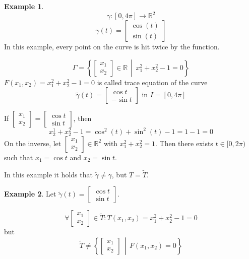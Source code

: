\documentclass[a4paper,landscape,twocolumn]{article}
\theoremstyle{definition}
\newtheorem{ex}{Example}
\newcommand\setdef[2]{\left\{#1\,\middle|\,#2\right\}}
\begin{document}
\begin{ex}
  \[ \gamma: [0, 4\pi] \to \mathbb R^2 \]
  \[ \gamma(t) = \begin{bmatrix} \cos(t) \\ \sin(t) \end{bmatrix} \]
  In this example, every point on the curve is hit twice by the function.

  \[ \Gamma = \setdef{\begin{bmatrix} x_1 \\ x_2 \end{bmatrix} \in \mathbb R}{x_1^2 + x_2^2 - 1 =0 } \]
  $F(x_1, x_2) = x_1^2 + x_2^2 - 1 = 0$ is called trace equation of the curve
  \[ \tilde{\gamma}(t) = \begin{bmatrix} \cos{t} \\ -\sin{t} \end{bmatrix} \text{ in } I = [0, 4\pi] \]

  If $\begin{bmatrix} x_1 \\ x_2 \end{bmatrix} = \begin{bmatrix} \cos{t} \\ \sin{t} \end{bmatrix}$, then
  \[ x_2^1 + x_2^2 - 1 = \cos^2(t) + \sin^2(t) - 1 = 1 - 1 = 0 \]
  On the inverse, let $\begin{bmatrix} x_1 \\ x_2 \end{bmatrix} \in \mathbb R^2$ with $x_1^2 + x_2^2 = 1$. Then there exists $t \in [0,2\pi)$ such that $x_1 = \cos{t}$ and $x_2 = \sin{t}$.

  In this example it holds that $\tilde{\gamma} \neq \gamma$, but $T = \tilde{T}$.
\end{ex}

\begin{ex}
  Let $\tilde{\gamma}(t) = \begin{bmatrix} \cos{t} \\ \sin{t} \end{bmatrix}$.

  \[ \forall \begin{bmatrix} x_1 \\ x_2 \end{bmatrix} \in \tilde{T}: T(x_1, x_2) = x_1^2 + x_2^2 - 1 = 0 \]
  but
  \[ \tilde{T} \neq \setdef{\begin{bmatrix} x_1 \\ x_2 \end{bmatrix}}{F(x_1, x_2) = 0} \]
\end{ex}
\end{document}
